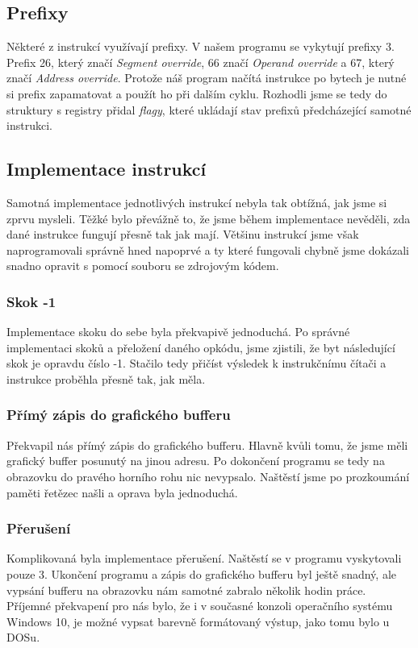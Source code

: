 \documentclass[a4paper, 12pt]{article}
\begin{document}
\subsection{Prefixy}
Některé z instrukcí využívají prefixy. V našem programu se vykytují prefixy 3. Prefix 26, který značí \textit{Segment override}, 66 značí \textit{Operand override} a 67, který značí \textit{Address override}. Protože náš program načítá instrukce po bytech je nutné si prefix zapamatovat a použít ho při dalším cyklu. Rozhodli jsme se tedy do struktury s registry přidal \textit{flagy}, které ukládají stav prefixů předcházející samotné instrukci.
\subsection{Implementace instrukcí}
Samotná implementace jednotlivých instrukcí nebyla tak obtížná, jak jsme si zprvu mysleli. Těžké bylo převážně to, že jsme během implementace nevěděli, zda dané instrukce fungují přesně tak jak mají. Většinu instrukcí jsme však naprogramovali správně hned napoprvé a ty které fungovali chybně jsme dokázali snadno opravit s pomocí souboru se zdrojovým kódem.
\subsubsection{Skok -1}
Implementace skoku do sebe byla překvapivě jednoduchá. Po správné implementaci skoků a přeložení daného opkódu, jsme zjistili, že byt následující skok je opravdu číslo -1. Stačilo tedy přičíst výsledek k instrukčnímu čítači a instrukce proběhla přesně tak, jak měla.
\subsubsection{Přímý zápis do grafického bufferu}
Překvapil nás přímý zápis do grafického bufferu. Hlavně kvůli tomu, že jsme měli grafický buffer posunutý na jinou adresu. Po dokončení programu se tedy na obrazovku do pravého horního rohu nic nevypsalo. Naštěstí jsme po prozkoumání paměti řetězec našli a oprava byla jednoduchá.
\subsubsection{Přerušení}
Komplikovaná byla implementace přerušení. Naštěstí se v programu vyskytovali pouze 3. Ukončení programu a zápis do grafického bufferu byl ještě snadný, ale vypsání bufferu na obrazovku nám samotné zabralo několik hodin práce. Příjemné překvapení pro nás bylo, že i v současné konzoli operačního systému Windows 10, je možné vypsat barevně formátovaný výstup, jako tomu bylo u DOSu. 
\end{document}
